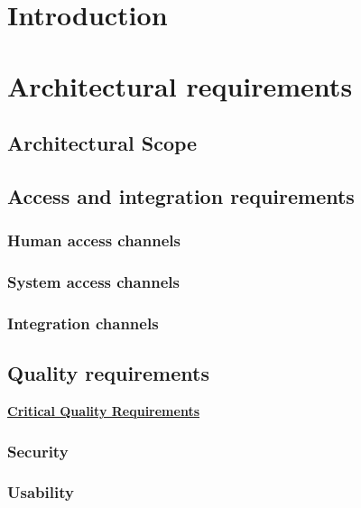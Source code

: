 \documentclass[a4paper,12pt,titlepage]{article}
\begin{document}


\tableofcontents
\newpage

\section{Introduction}

\section{Architectural requirements}
	\subsection{Architectural Scope} %
	
	\newpage
	
	\subsection{Access and integration requirements}
			\subsubsection{Human access channels}	
				
			\subsubsection{System access channels}
					
			\subsubsection{Integration channels}
				
 	\subsection{Quality requirements}
 	
		\underline{\textbf{Critical Quality Requirements}}
		\subsubsection{Security}
			
			
		\subsubsection{Usability}
			
			
\end{document}
